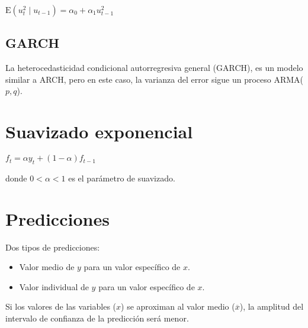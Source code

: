 \documentclass[10pt, a4paper, landscape]{extarticle}
\newcommand{\E}{\mathrm{E}}
\begin{document}
\begin{multicols}{3}
\begin{center}
	$\E(u^2_t \mid u_{t - 1}) = \alpha_0 + \alpha_1 u^2_{t - 1}$
\end{center}

\subsection*{GARCH}

La heterocedasticidad condicional autorregresiva general (GARCH), es un modelo similar a ARCH, pero en este caso, la varianza del error sigue un proceso ARMA($p, q$).

\section*{Suavizado exponencial}

\begin{center}
	$f_t = \alpha y_t + (1 - \alpha) f_{t - 1}$
\end{center}

donde $0 < \alpha < 1$ es el parámetro de suavizado.

\section*{Predicciones}

Dos tipos de predicciones:

\begin{itemize}[leftmargin=*]
	\item Valor medio de $y$ para un valor específico de $x$.
	\item Valor individual de $y$ para un valor específico de $x$.
\end{itemize}

Si los valores de las variables ($x$) se aproximan al valor medio ($\overline{x}$), la amplitud del intervalo de confianza de la predicción será menor.

\end{multicols}
\end{document}
